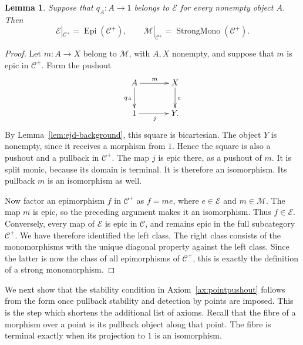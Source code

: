 \documentclass[11pt,a4paper]{article}
\theoremstyle{plain}
\newtheorem{lemma}[theorem]{Lemma}
\theoremstyle{definition}
\theoremstyle{remark}
\begin{document}
\begin{lemma}\label{lem:ejd-nonempty-classes}
Suppose that $q_A:A\to1$ belongs to $\mathcal E$ for every
nonempty object $A$. Then
\[
\mathcal E|_{\mathcal C^+}=\operatorname{Epi}(\mathcal C^+),
\qquad
\mathcal M|_{\mathcal C^+}
=\operatorname{StrongMono}(\mathcal C^+).
\]
\end{lemma}
\begin{proof}
Let $m:A\to X$ belong to $\mathcal M$, with $A,X$ nonempty,
and suppose that $m$ is epic in $\mathcal C^+$. Form the pushout
\[
\xymatrix@C=3.5em@R=2.4em{
A\ar[r]^m\ar[d]_{q_A}&X\ar[d]^c\\
1\ar[r]_j&Y.
}
\]
By Lemma~\ref{lem:ejd-background}, this square is bicartesian.
The object $Y$ is nonempty, since it receives a morphism from
$1$. Hence the square is also a pushout and a pullback in
$\mathcal C^+$. The map $j$ is epic there, as a pushout of
$m$. It is split monic, because its domain is terminal.
It is therefore an isomorphism. Its pullback $m$ is an
isomorphism as well.

Now factor an epimorphism $f$ in $\mathcal C^+$ as $f=me$,
where $e\in\mathcal E$ and $m\in\mathcal M$. The map $m$
is epic, so the preceding argument makes it an isomorphism.
Thus $f\in\mathcal E$. Conversely, every map of $\mathcal E$
is epic in $\mathcal C$, and remains epic in the full subcategory
$\mathcal C^+$. We have therefore identified the left class.
The right class consists of the monomorphisms with the unique
diagonal property against the left class. Since the latter is
now the class of all epimorphisms of $\mathcal C^+$, this is
exactly the definition of a strong monomorphism.
\end{proof}

We next show that the stability condition in
Axiom~\ref{ax:pointpushout} follows from the form once
pullback stability and detection by points are imposed. This
is the step which shortens the additional list of axioms.
Recall that the fibre of a morphism over a point is its pullback
object along that point. The fibre is terminal exactly when its
projection to $1$ is an isomorphism.
\end{document}
